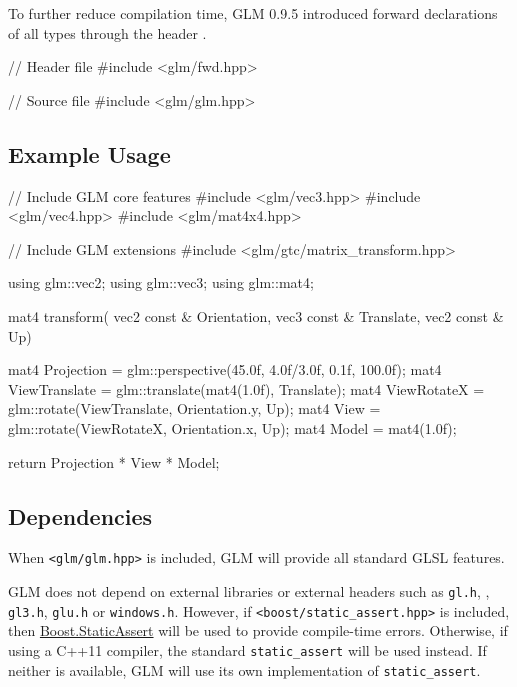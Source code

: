 \documentclass{scrartcl}
\numberwithin{figure}{subsection}
\begin{document}
To further reduce compilation time, GLM 0.9.5 introduced forward declarations of all types through the header .

\begin{cppcode}
// Header file
#include <glm/fwd.hpp>
\end{cppcode}

\begin{cppcode}
// Source file
#include <glm/glm.hpp>
\end{cppcode}

\subsection{Example Usage}

\begin{cppcode}
// Include GLM core features
#include <glm/vec3.hpp>
#include <glm/vec4.hpp>
#include <glm/mat4x4.hpp>

// Include GLM extensions
#include <glm/gtc/matrix_transform.hpp>

using glm::vec2;
using glm::vec3;
using glm::mat4;

mat4 transform(
  vec2 const & Orientation, 
  vec3 const & Translate,
  vec2 const & Up)
{
  mat4 Projection = glm::perspective(45.0f, 4.0f/3.0f, 0.1f, 100.0f);
  mat4 ViewTranslate = glm::translate(mat4(1.0f), Translate);
  mat4 ViewRotateX = glm::rotate(ViewTranslate, Orientation.y, Up);
  mat4 View = glm::rotate(ViewRotateX, Orientation.x, Up);
  mat4 Model = mat4(1.0f);
        
  return Projection * View * Model;
}
\end{cppcode}


\subsection{Dependencies}

When \verb|<glm/glm.hpp>| is included, GLM will provide all standard GLSL features.

GLM does not depend on external libraries or external headers such as \verb|gl.h|, , \verb|gl3.h|, \verb|glu.h| or \verb|windows.h|. However, if \verb|<boost/static_assert.hpp>| is included, then  \href{http://www.boost.org/doc/libs/release/libs/static_assert/}{Boost.StaticAssert}  will be used to provide compile-time errors.  Otherwise, if using a C++11 compiler, the standard \verb|static_assert| will be used instead. If neither is available, GLM will use its own implementation of \verb|static_assert|.
\end{document}

